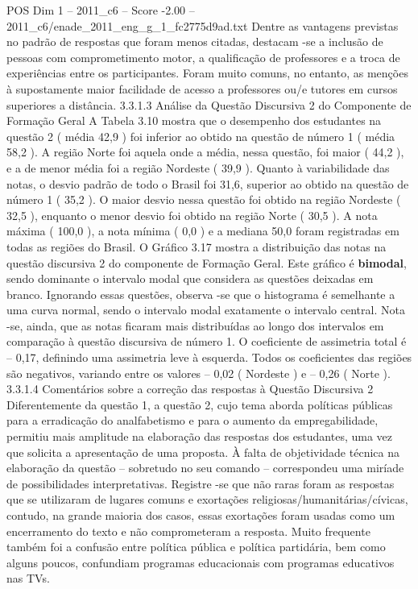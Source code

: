 \begin{textsample}{POS Dim 1 – 2011\_c6 – Score -2.00 – 2011\_c6/enade\_2011\_eng\_g\_1\_fc2775d9ad.txt}
Dentre as vantagens previstas no padrão de respostas que foram menos citadas, destacam -se a inclusão de pessoas com comprometimento motor, a qualificação de professores e a troca de experiências entre os participantes.
Foram muito comuns, no entanto, as menções à supostamente maior facilidade de acesso a professores ou/e tutores em cursos superiores a distância. 3.3.1.3 Análise da Questão Discursiva 2 do Componente de Formação Geral A Tabela 3.10 mostra que o desempenho dos estudantes na questão 2 ( média 42,9 ) foi inferior ao obtido na questão de número 1 ( média 58,2 ).
A região Norte foi aquela onde a média, nessa questão, foi maior ( 44,2 ), e a de menor média foi a região Nordeste ( 39,9 ).
Quanto à variabilidade das notas, o desvio padrão de todo o Brasil foi 31,6, superior ao obtido na questão de número 1 ( 35,2 ).
O maior desvio nessa questão foi obtido na região Nordeste ( 32,5 ), enquanto o menor desvio foi obtido na região Norte ( 30,5 ).
A nota máxima ( 100,0 ), a nota mínima ( 0,0 ) e a mediana 50,0 foram registradas em todas as regiões do Brasil.
O Gráfico 3.17 mostra a distribuição das notas na questão discursiva 2 do componente de Formação Geral.
Este gráfico é \textbf{bimodal}, sendo dominante o intervalo modal que considera as questões deixadas em branco.
Ignorando essas questões, observa -se que o histograma é semelhante a uma curva normal, sendo o intervalo modal exatamente o intervalo central.
Nota -se, ainda, que as notas ficaram mais distribuídas ao longo dos intervalos em comparação à questão discursiva de número 1.
O coeficiente de assimetria total é – 0,17, definindo uma assimetria leve à esquerda.
Todos os coeficientes das regiões são negativos, variando entre os valores – 0,02 ( Nordeste ) e – 0,26 ( Norte ). 3.3.1.4 Comentários sobre a correção das respostas à Questão Discursiva 2 Diferentemente da questão 1, a questão 2, cujo tema aborda políticas públicas para a erradicação do analfabetismo e para o aumento da empregabilidade, permitiu mais amplitude na elaboração das respostas dos estudantes, uma vez que solicita a apresentação de uma proposta.
À falta de objetividade técnica na elaboração da questão – sobretudo no seu comando – correspondeu uma miríade de possibilidades interpretativas.
Registre -se que não raras foram as respostas que se utilizaram de lugares comuns e exortações religiosas/humanitárias/cívicas, contudo, na grande maioria dos casos, essas exortações foram usadas como um encerramento do texto e não comprometeram a resposta.
Muito frequente também foi a confusão entre política pública e política partidária, bem como alguns poucos, confundiam programas educacionais com programas educativos nas TVs.

\end{textsample}
